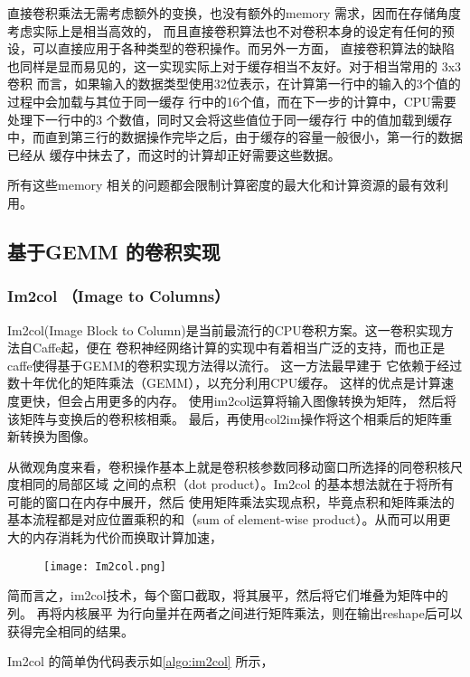 直接卷积乘法无需考虑额外的变换，也没有额外的memory 需求，因而在存储角度考虑实际上是相当高效的，
而且直接卷积算法也不对卷积本身的设定有任何的预设，可以直接应用于各种类型的卷积操作。而另外一方面，
直接卷积算法的缺陷也同样是显而易见的，这一实现实际上对于缓存相当不友好。对于相当常用的 3x3 卷积
而言，如果输入的数据类型使用32位表示，在计算第一行中的输入的3个值的过程中会加载与其位于同一缓存
行中的16个值，而在下一步的计算中，CPU需要处理下一行中的3 个数值，同时又会将这些值位于同一缓存行
中的值加载到缓存中，而直到第三行的数据操作完毕之后，由于缓存的容量一般很小，第一行的数据已经从
缓存中抹去了，而这时的计算却正好需要这些数据。

所有这些memory 相关的问题都会限制计算密度的最大化和计算资源的最有效利用。

\subsection{基于GEMM 的卷积实现}

\subsubsection{Im2col （Image to Columns）}

Im2col(Image Block to Column)是当前最流行的CPU卷积方案。这一卷积实现方法自Caffe\cite{Jia2014CaffeCA}起，便在
卷积神经网络计算的实现中有着相当广泛的支持，而也正是caffe使得基于GEMM的卷积实现方法得以流行。
这一方法最早建于\cite{Chellapilla2006HighPC} 它依赖于经过数十年优化的矩阵乘法（GEMM），以充分利用CPU缓存。
这样的优点是计算速度更快，但会占用更多的内存。 使用im2col运算将输入图像转换为矩阵，
然后将该矩阵与变换后的卷积核相乘。 最后，再使用col2im操作将这个相乘后的矩阵重新转换为图像。

从微观角度来看，卷积操作基本上就是卷积核参数同移动窗口所选择的同卷积核尺度相同的局部区域
之间的点积（dot product）。Im2col 的基本想法就在于将所有可能的窗口在内存中展开，然后
使用矩阵乘法实现点积，毕竟点积和矩阵乘法的基本流程都是对应位置乘积的和（sum of element-wise
product）。从而可以用更大的内存消耗为代价而换取计算加速，

\begin{figure}
  \texttt{[image: Im2col.png]}
\end{figure}

简而言之，im2col技术，每个窗口截取，将其展平，然后将它们堆叠为矩阵中的列。 再将内核展平
为行向量并在两者之间进行矩阵乘法，则在输出reshape后可以获得完全相同的结果。

Im2col 的简单伪代码表示如\ref{algo:im2col} 所示，

